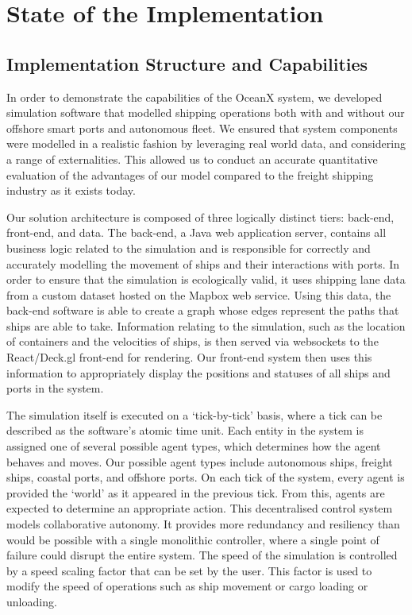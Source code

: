 \newpage
\section{State of the Implementation}
\label{sec:system_state}

\subsection{Implementation Structure and Capabilities}

In order to demonstrate the capabilities of the OceanX system, we developed simulation software that modelled shipping operations both with and without our offshore smart ports and autonomous fleet. We ensured that system components were modelled in a realistic fashion by leveraging real world data, and considering a range of externalities. This allowed us to conduct an accurate quantitative evaluation of the advantages of our model compared to the freight shipping industry as it exists today.

Our solution architecture is composed of three logically distinct tiers: back-end, front-end, and data. The back-end, a Java web application server, contains all business logic related to the simulation and is responsible for correctly and accurately modelling the movement of ships and their interactions with ports. In order to ensure that the simulation is ecologically valid, it uses shipping lane data from a custom dataset hosted on the Mapbox web service. Using this data, the back-end software is able to create a graph whose edges represent the paths that ships are able to take. Information relating to the simulation, such as the location of containers and the velocities of ships, is then served via websockets to the React/Deck.gl front-end for rendering. Our front-end system then uses this information to appropriately display the positions and statuses of all ships and ports in the system.

The simulation itself is executed on a `tick-by-tick’ basis, where a tick can be described as the software’s atomic time unit. Each entity in the system is assigned one of several possible agent types, which determines how the agent behaves and moves. Our possible agent types include autonomous ships, freight ships, coastal ports, and offshore ports. On each tick of the system, every agent is provided the ‘world’ as it appeared in the previous tick. From this, agents are expected to determine an appropriate action. This decentralised control system models collaborative autonomy. It provides more redundancy and resiliency than would be possible with a single monolithic controller, where a single point of failure could disrupt the entire system. The speed of the simulation is controlled by a speed scaling factor that can be set by the user. This factor is used to modify the speed of operations such as ship movement or cargo loading or unloading. 

